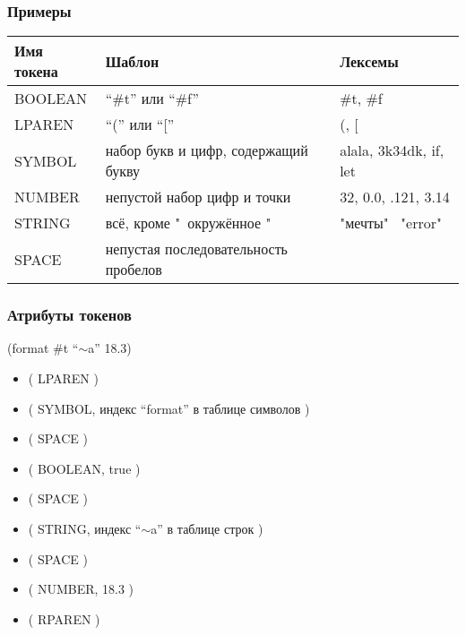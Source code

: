 \documentclass[16pt,pdf,unicode]{beamer}
\begin{document}
\begin{frame}
  \frametitle{Примеры}
  \begin{table}
    \begin{tabular}{l|p{4.5cm}|p{4cm}}
      \hline
      {\bf Имя токена} & {\bf Шаблон} & {\bf Лексемы} \\ \hline \hline
      BOOLEAN & ``\#t'' или ``\#f'' & \#t, \#f \\ 
      LPAREN & ``('' или ``['' & (, [ \\ 
      SYMBOL & набор букв и цифр, содержащий букву & alala, 3k34dk, if, let \\ 
      NUMBER & непустой набор цифр и точки & 32, 0.0, .121, 3.14 \\
      STRING & всё, кроме "\, окружённое " & "мечты" \, "error"\\
      SPACE & непустая последовательность пробелов & \\
    \end{tabular}
  \end{table}
\end{frame}

\begin{frame}
  \frametitle{Атрибуты токенов}
  \begin{block}{}
    (format \#t ``$\sim$a'' 18.3)
  \end{block}
  \begin{itemize}
  \item ( LPAREN )
  \item ( SYMBOL, индекс ``format'' в таблице символов )
  \item ( SPACE ) 
  \item ( BOOLEAN, true ) 
  \item ( SPACE ) 
  \item ( STRING, индекс ``$\sim$a'' в таблице строк ) 
  \item ( SPACE ) 
  \item ( NUMBER, 18.3 ) 
  \item ( RPAREN ) 
  \end{itemize}
\end{frame}
\end{document}

